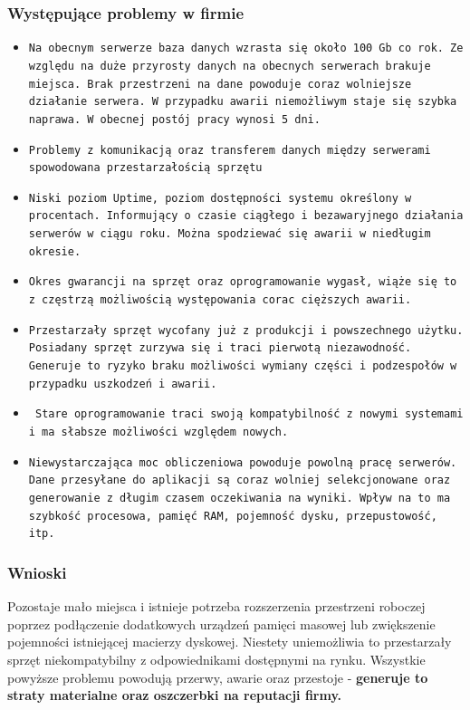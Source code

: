 \documentclass[a4paper, 12pt]{article}
\begin{document}
\subsubsection{Występujące problemy w firmie} 
		\begin{itemize}
		        \item \texttt{Na obecnym serwerze baza danych wzrasta się około 100 Gb co rok. Ze względu na duże przyrosty danych na obecnych serwerach brakuje miejsca. Brak przestrzeni na dane powoduje coraz wolniejsze działanie serwera. W przypadku awarii niemożliwym staje się szybka naprawa. W obecnej postój pracy wynosi 5 dni.}
	        	\item \texttt{Problemy z komunikacją oraz transferem danych między serwerami spowodowana przestarzałością sprzętu}
	        	\item \texttt{Niski poziom Uptime, poziom dostępności systemu określony w procentach. Informujący o czasie ciągłego i bezawaryjnego działania serwerów w ciągu roku. Można spodziewać się awarii w niedługim okresie.}
	        	\item \texttt{Okres gwarancji na sprzęt oraz oprogramowanie wygasł, wiąże się to z częstrzą możliwością występowania corac cięższych awarii.}
	        	\item \texttt{Przestarzały sprzęt wycofany już z produkcji i powszechnego użytku. Posiadany sprzęt zurzywa się i traci pierwotą niezawodność. Generuje to ryzyko braku możliwości wymiany części i podzespołów w przypadku uszkodzeń i awarii.}
	        	\item \texttt{ Stare oprogramowanie traci swoją kompatybilność z nowymi systemami i ma słabsze możliwości względem nowych.}
	        	\item \texttt{Niewystarczająca moc obliczeniowa powoduje powolną pracę serwerów. Dane przesyłane do aplikacji są coraz wolniej selekcjonowane oraz generowanie z długim czasem oczekiwania na wyniki. Wpływ na to ma szybkość procesowa, pamięć RAM, pojemność dysku, przepustowość, itp.}
		    \end{itemize}
	  \subsubsection{Wnioski} 
	
			 	\hspace*{1cm} Pozostaje mało miejsca i istnieje potrzeba rozszerzenia przestrzeni roboczej poprzez podłączenie dodatkowych urządzeń pamięci masowej lub zwiększenie pojemności istniejącej macierzy dyskowej. Niestety uniemożliwia to przestarzały sprzęt niekompatybilny z odpowiednikami dostępnymi na rynku.\newline
			\hspace*{1cm}  Wszystkie powyższe problemu powodują przerwy, awarie oraz  przestoje - \textbf{generuje to straty materialne oraz oszczerbki na reputacji firmy.}
			
\end{document}
